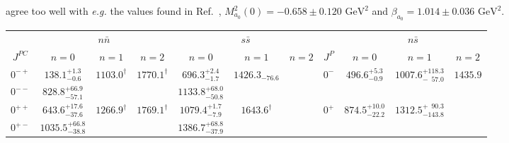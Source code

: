 agree too well with {\it e.g.} the values found in Ref.~\cite{Ebert:2009ub}, 
$M^2_{a_0}(0) = -0.658 \pm 0.120\,\, \mbox{GeV}^2$ and
$\beta_{a_0} = 1.014 \pm 0.036 \,\,\mbox{GeV}^2$.
%
\begin{table}[!th]
\renewcommand{\arraystretch}{1.3}
\begin{tabular}{c|ccc|ccc||c|ccc}
\hline
\hline
                            & \multicolumn{3}{c|}{$n\bar{n}   $}                                                         & \multicolumn{3}{c||}{$s\bar{s}$}                                           &          & \multicolumn{3}{c}{$n\bar{s}$}  \\
$J^{PC}$                    & $n=0$                                &   $n=1$                            &          $n=2$ & $n=0$                     &   $n=1$                   &          $n=2$    &  $J^P   $&  $n=0$    &$n=1$  & $n=2$ \\
\hline                                                                                                                                                                                                     
$0^{-+}$                    & $138.1^{+1.3}_{-0.6}$                &   $1103.0^\dag$                    &  $1770.1^\dag$ &  $696.3^{+2.4}_{-1.7}$    &  $1426.3_{-76.6}$         &                   &  \multirow{2}{*}{$0^-$}       &   \multirow{2}{*}{ $496.6^{+5.3}_{-0.9}$} &  \multirow{2}{*}{$1007.6^{+118.3}_{-\phantom{1}57.0}$ } & \multirow{2}{*}{$1435.9$} \\                                                                                                                                                                        
$0^{--}$                    & $828.8^{+66.9}_{-57.1}$              &                                    &                &  $1133.8^{+68.0}_{-50.8}$ &                           &                   &         &     & & \\
$0^{++}$                    & $643.6^{+17.6}_{-37.6}$              &   $1266.9^\dag$                    &  $1769.1^\dag$ &  $1079.4^{+1.7}_{-7.9}$   &  $1643.6^\dag$            &                   &  \multirow{2}{*}{$0^+$}       &  \multirow{2}{*}{ $874.5^{+10.0}_{-22.2}$ } &  \multirow{2}{*}{$1312.5^{+\phantom{1}90.3}_{-143.8}$} & \multirow{2}{*}{} \\                                                                                                                                                                        
$0^{+-}$                    & $1035.5^{+66.8}_{-38.8}$             &                                    &                &  $1386.7^{+68.8}_{-37.9}$ &                           &                   &         &     & & \\

\end{tabular}
\end{table}
